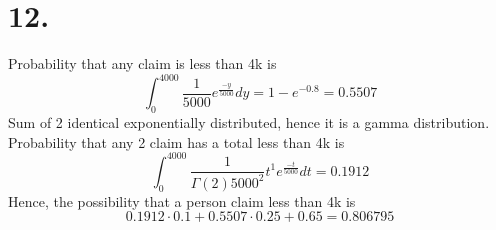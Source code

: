 \documentclass[11pt]{article}
\begin{document}
\section*{12.}
Probability that any claim is less than 4k is 
\[
\int_0^{4000} \frac{1}{5000}e^{\frac{-y}{5000}}dy = 1- e^{-0.8} = 0.5507
\]
Sum of 2 identical exponentially distributed, hence it is a gamma distribution. 
Probability that any 2 claim has a total less than 4k is 
\[
    \int_0^{4000} \frac{1}{\Gamma(2) 5000^2} t^1 e^{\frac{-t}{5000}} dt = 0.1912
\]
Hence, the possibility that a person claim less than 4k is 
\[
0.1912 \cdot 0.1 + 0.5507 \cdot 0.25 + 0.65 = 0.806795  
\]
\end{document}
